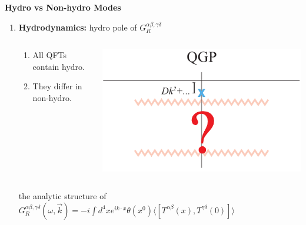 \documentclass[9pt,a4paper,unknownkeysallowed,xcolor=dvipsnames,aspectratio=43]{beamer}
\begin{document}
%
%
%
\setcounter{page}{10}
\begin{frame}{\bf\huge Hydro vs Non-hydro Modes}
\vspace{4mm}
\begin{enumerate}
\item{\Large{\bf Hydrodynamics:} hydro pole of $G_R^{\alpha\beta, \gamma\delta}$}
\vspace{2mm}
\begin{columns}
\begin{column}{0.55\textwidth}
\vspace{4mm}
\begin{enumerate}
\item{\large All QFTs contain hydro.}
\vspace{4mm}
\item{\color{darkred}\large They differ in non-hydro.}
\end{enumerate}
\vspace{4mm}
\end{column}
\begin{column}{0.3\textwidth}
\begin{center}
\includegraphics[width=\textwidth]{fig/omega_QCD}
\end{center}
\end{column}
\end{columns}
\vspace{4mm}
\begin{center}
the analytic structure of {\small $G_R^{\alpha\beta, \gamma\delta}(\omega, \vec{k}) = -i\int d^4 x e^{ik\cdot x}\theta(x^0)\langle[T^{\alpha\beta}(x),T^{\gamma\delta}(0)] \rangle$}
\\\vspace{1mm}

\end{center}
\end{enumerate}
\end{frame}
\end{document}
